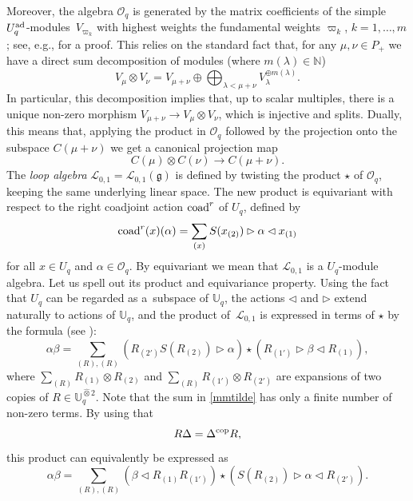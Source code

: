 \documentclass[pdftex]{sigma}
\numberwithin{equation}{section}
\theoremstyle{definition}
\newcommand{\Oq}{\Oo_{q}}
\newcommand{\mUq}{\mathbb{U}_q}
\newcommand{\mn}{\mathbb{N}}
\newcommand{\Ll}{{\mathcal L}}
\newcommand{\Oo}{{\mathcal O}}
\newcommand{\ra}{\rightarrow}
\begin{document}
Moreover, the algebra $\Oo_q$ is generated by the matrix coefficients of the simple $U_q^{\rm ad}$-modules~$V_{\!\varpi_{\!k}}$ with highest weights the fundamental weights $\varpi_k$, $k=1,\dots,m$; see, e.g., \cite[Proposition~I.7.8]{BG} for a proof. This relies on the standard fact that, for any $\mu,\nu \in P_+$ we have a direct sum decomposition of modules (where $m(\lambda)\in \mn$)
\begin{equation}\label{decomprep}
V_\mu\otimes V_\nu = V_{\mu+\nu} \oplus \bigoplus_{\lambda < \mu+\nu} V_\lambda^{\oplus m(\lambda)}.
\end{equation}
In particular, this decomposition implies that, up to scalar multiples, there is a unique non-zero morphism $V_{\mu+\nu} \ra V_\mu\otimes V_\nu$, which is injective and splits. Dually, this means that, applying the product in $\Oo_q$ followed by the projection onto the subspace $C(\mu+\nu)$ we get a canonical projection map
\begin{equation}\label{projOq}
C(\mu)\otimes C(\nu) \ra C(\mu+\nu).
\end{equation}
The {\it loop algebra} $\Ll_{0,1} = \Ll_{0,1}(\mathfrak{g})$ is defined by twisting the product $\star$ of $\Oo_q$, keeping the same underlying linear space. The new product is equivariant with respect to the right coadjoint action ${\rm coad}^r$ of $U_q$, defined by
\[{\rm coad}^r(x)(\alpha) = \sum_{(x)}{S}(x_{(2)}) \rhd \alpha \lhd x_{(1)}\]
for all $x\in U_q$ and $\alpha\in \Oq$. By equivariant we mean that $\Ll_{0,1}$ is a $U_q$-module algebra. Let us spell out its product and equivariance property. Using the fact that $U_q$ can be regarded as a~subspace of $\mUq$, the actions $\lhd$ and $\rhd$ extend naturally to actions of $\mUq$, and the product of~$\Ll_{0,1}$ is expressed in terms of $\star$ by the formula (see \cite[Proposition 4.1]{BR}):
\begin{equation}\label{mmtilde}
\alpha\beta = \sum_{(R),(R)}(R_{(2')}{S}(R_{(2)}) \rhd \alpha) \star (R_{(1')}\rhd \beta \lhd R_{(1)}),
\end{equation}
where $ \sum_{(R)}R_{(1) }\otimes R_{(2)}$ and $\sum_{(R)}R_{(1') }\otimes R_{(2')}$ are expansions of two copies of $R\in \mUq^{\hat \otimes 2}$. Note that the sum in \eqref{mmtilde} has only a finite number of non-zero terms. By using that
\[R\Delta = \Delta^{\rm cop}R,\]
 this product can equivalently be expressed as
\begin{equation}\label{mmtildebis}
\alpha\beta = \sum_{(R),(R)}(\beta \lhd R_{(1)}R_{(1')}) \star (S(R_{(2)})\rhd \alpha \lhd R_{(2')}).
\end{equation}
\end{document}
